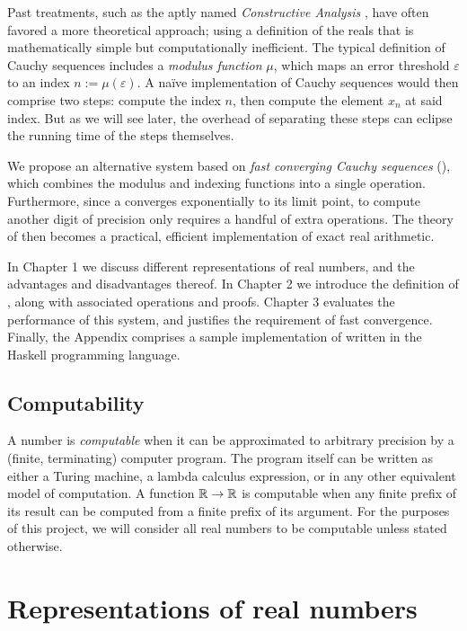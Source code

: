 \documentclass[leqno]{report}
\begin{document}
Past treatments, such as the aptly named \textit{Constructive Analysis} \citep{bishop1985constructive}, have often favored a more theoretical approach; using a definition of the reals that is mathematically simple but computationally inefficient. The typical definition of Cauchy sequences includes a \textit{modulus function} $\mu$, which maps an error threshold $\varepsilon$ to an index $n := \mu(\varepsilon)$. A naïve implementation of Cauchy sequences would then comprise two steps: compute the index $n$, then compute the element $x_n$ at said index. But as we will see later, the overhead of separating these steps can eclipse the running time of the steps themselves.

We propose an alternative system based on \textit{fast converging Cauchy sequences} (\FCCS), which combines the modulus and indexing functions into a single operation. Furthermore, since a \FCCS{} converges exponentially to its limit point, to compute another digit of precision only requires a handful of extra operations. The theory of \FCCS{} then becomes a practical, efficient implementation of exact real arithmetic.

In Chapter 1 we discuss different representations of real numbers, and the advantages and disadvantages thereof. In Chapter 2 we introduce the definition of \FCCS, along with associated operations and proofs. Chapter 3 evaluates the performance of this system, and justifies the requirement of fast convergence. Finally, the Appendix comprises a sample implementation of \FCCS{} written in the Haskell programming language.

\section{Computability}

A number is \textit{computable} when it can be approximated to arbitrary precision by a (finite, terminating) computer program. The program itself can be written as either a Turing machine, a lambda calculus expression, or in any other equivalent model of computation. A function $\mathbb{R} \rightarrow \mathbb{R}$ is computable when any finite prefix of its result can be computed from a finite prefix of its argument. For the purposes of this project, we will consider all real numbers to be computable unless stated otherwise.

\chapter{Representations of real numbers}
\end{document}
